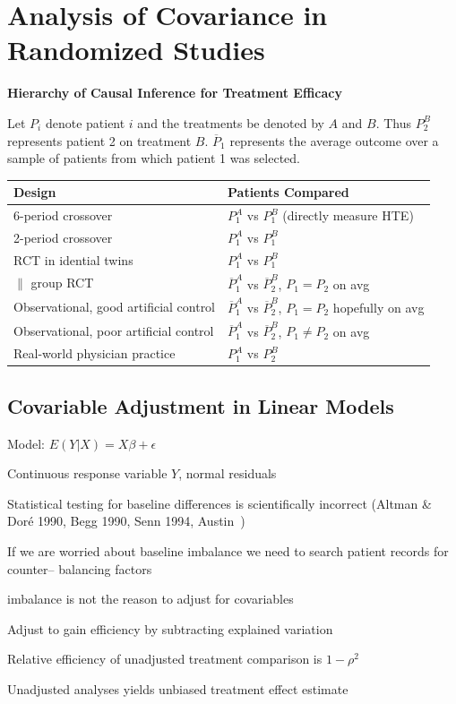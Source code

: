 

\def\apacue{1}
\chapter{Analysis of Covariance in Randomized Studies}\label{chap:ancova}

{\smaller[-1] \textbf{Hierarchy of Causal Inference for Treatment Efficacy}}

\bigskip

Let $P_{i}$ denote patient $i$ and the treatments be denoted by $A$
and $B$.  Thus $P_{2}^{B}$ represents patient 2 on treatment $B$.
$\overline{P}_{1}$ represents the average outcome over a sample of
patients from which patient 1 was selected.

\medskip

\begin{tabular}{ll}
\textbf{Design} & \textbf{Patients Compared} \\ \hline
6-period crossover & $P_{1}^{A}$ vs $P_{1}^{B}$ (directly measure HTE)\\
2-period crossover & $P_{1}^{A}$ vs $P_{1}^{B}$ \\
RCT in idential twins & $P_{1}^{A}$ vs $P_{1}^{B}$ \\
$\parallel$ group RCT & $\overline{P}_{1}^{A}$ vs $\overline{P}_{2}^{B}$, 
$P_{1}=P_{2}$ on avg \\
Observational, good artificial control & $\overline{P}_{1}^{A}$ vs 
$\overline{P}_{2}^{B}$, $P_{1}=P_{2}$ hopefully on avg\\
Observational, poor artificial control & $\overline{P}_{1}^{A}$ vs 
$\overline{P}_{2}^{B}$, $P_{1}\neq P_{2}$ on avg\\
Real-world physician practice & $P_{1}^{A}$ vs $P_{2}^{B}$ \\
 \hline
\end{tabular}


\section{Covariable Adjustment in Linear
  Models} 
\bi
\item   Model: $E(Y | X) = X \beta + \epsilon$
\item   Continuous response variable $Y$, normal residuals
\item   Statistical testing for baseline differences is scientifically
        incorrect (Altman \& Dor\'{e} 1990, Begg 1990, Senn 1994,
        Austin~)
\item   If we are worried about baseline imbalance we need to search
        patient records for counter-- balancing factors
\item   \ra imbalance is not the reason to adjust for covariables
\item   Adjust to gain efficiency by subtracting explained variation
\item   Relative efficiency of unadjusted treatment comparison is $1-\rho^2$
\item   Unadjusted analyses yields unbiased treatment effect estimate
\ei

